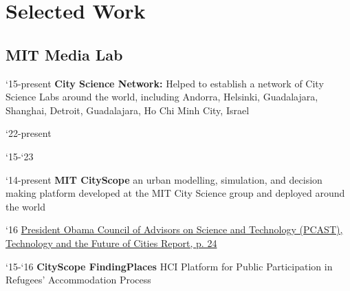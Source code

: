\section*{Selected Work}

\subsection*{MIT Media Lab}

\begin{tablist}

   \item[`15-present] \tab \textbf{City Science Network:} {Helped to establish a network of City Science Labs around the world, including Andorra, Helsinki, Guadalajara, Shanghai, Detroit, Guadalajara, Ho Chi Minh City, Israel}

      \begin{tablist}
      \item[`22-present] 
   \end{tablist}

   \begin{tablist}
      \item[`15-`23] 
   \end{tablist}


   \item[`14-present] \tab \textbf{MIT CityScope} {an urban modelling, simulation, and decision making platform developed at the MIT City Science group and deployed around the world}

   \begin{tablist}
      \item[`16] \tab \href{https://obamawhitehouse.archives.gov/blog/2016/02/23/pcast-releases-technology-and-future-cities-report-president}{President Obama Council of Advisors on Science and Technology (PCAST), Technology and the Future of Cities Report, p. 24}
   \end{tablist}

   \item[`15-`16] \tab \textbf{CityScope FindingPlaces} {HCI Platform for Public Participation in Refugees' Accommodation Process}


\end{tablist}
